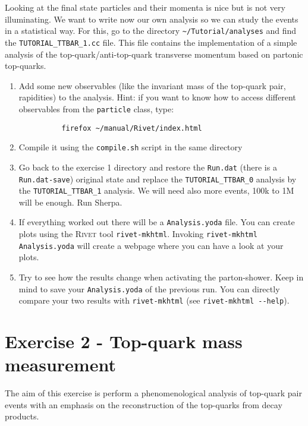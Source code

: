 \documentclass[a4paper,DIV12,fleqn]{scrartcl}
\begin{document}
Looking at the final state particles and their momenta is nice but is not very
illuminating. We want to write now our own analysis so we can study the events
in a statistical way. For this, go to the directory \verb|~/Tutorial/analyses|
and find the \verb|TUTORIAL_TTBAR_1.cc| file. This file contains the implementation
of a simple analysis of the top-quark/anti-top-quark transverse momentum
based on partonic top-quarks.
\begin{enumerate}
  \item Add some new observables (like the invariant mass of the top-quark
        pair, rapidities) to the analysis.
        Hint: if you want to know how to access different observables from
        the \verb|particle| class, type:
        \begin{verbatim}
          firefox ~/manual/Rivet/index.html
        \end{verbatim}
  \item Compile it using the \verb|compile.sh| script in the same directory
  \item Go back to the exercise 1 directory and restore the \verb|Run.dat|
        (there is a \verb|Run.dat-save|) original state and replace the
        \verb|TUTORIAL_TTBAR_0| analysis by the \verb|TUTORIAL_TTBAR_1|
        analysis.
        We will need also more events, 100k to 1M will be enough. Run Sherpa.
  \item If everything worked out there will be a \verb|Analysis.yoda| file.
        You can create plots using the \textsc{Rivet} tool \verb|rivet-mkhtml|.
        Invoking \verb|rivet-mkhtml Analysis.yoda| will create a webpage where
        you can have a look at your plots.
  \item Try to see how the results change when activating the parton-shower.
        Keep in mind to save your \verb|Analysis.yoda| of the previous run.
        You can directly compare your two results with \verb|rivet-mkhtml|
        (see \verb|rivet-mkhtml --help|).
\end{enumerate}

\section{Exercise 2 - Top-quark mass measurement}
\label{sec:task2}

The aim of this exercise is perform a phenomenological analysis
of top-quark pair events with an emphasis on the reconstruction
of the top-quarks from decay products.
\end{document}
